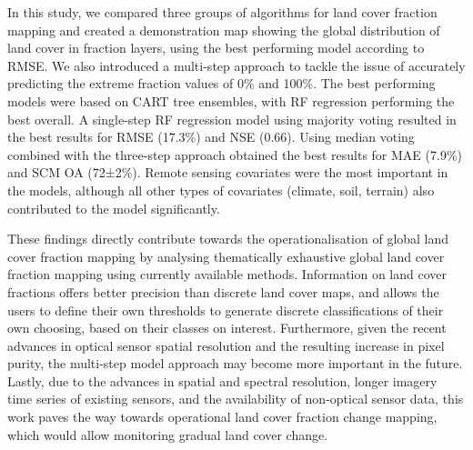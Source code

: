 \documentclass[review,authoryear,3p]{elsarticle}
\newcommand{\minisection}[1]{\paragraph{#1}}%
\begin{document}
In this study, we compared three groups of algorithms for land cover fraction mapping and created a demonstration map showing the global distribution of land cover in fraction layers, using the best performing model according to \gls{RMSE}.
We also introduced a multi-step approach to tackle the issue of accurately predicting the extreme fraction values of 0\% and 100\%.
The best performing models were based on \gls{CART} tree ensembles, with \gls{RF} regression performing the best overall.
A single-step \gls{RF} regression model using majority voting resulted in the best results for RMSE (17.3\%) and \gls{NSE} (0.66).
Using median voting combined with the three-step approach obtained the best results for \gls{MAE} (7.9\%) and \gls{SCM} \gls{OA} (72±2\%).
Remote sensing covariates were the most important in the models, although all other types of covariates (climate, soil, terrain) also contributed to the model significantly.

These findings directly contribute towards the operationalisation of global land cover fraction mapping by analysing thematically exhaustive global land cover fraction mapping using currently available methods.
Information on land cover fractions offers better precision than discrete land cover maps, and allows the users to define their own thresholds to generate discrete classifications of their own choosing, based on their classes on interest.
Furthermore, given the recent advances in optical sensor spatial resolution and the resulting increase in pixel purity, the multi-step model approach may become more important in the future.
Lastly, due to the advances in spatial and spectral resolution, longer imagery time series of existing sensors, and the availability of non-optical sensor data, this work paves the way towards operational land cover fraction change mapping, which would allow monitoring gradual land cover change.

\end{document}

